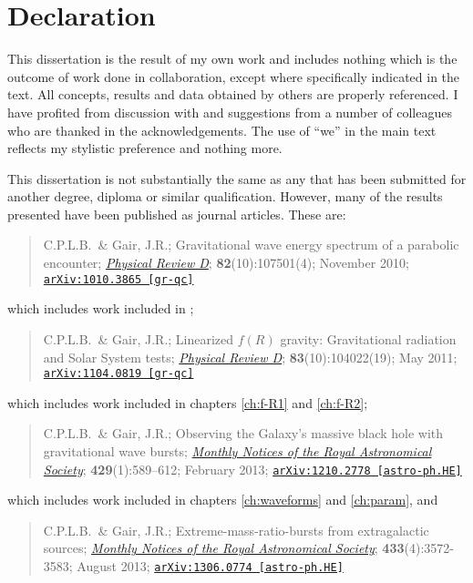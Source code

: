 \chapter*{Declaration}

This dissertation is the result of my own work and includes nothing which is the outcome of work done in collaboration, except where specifically indicated in the text. All concepts, results and data obtained by others are properly referenced. I have profited from discussion with and suggestions from a number of colleagues who are thanked in the acknowledgements. The use of ``we'' in the main text reflects my stylistic preference and nothing more.

This dissertation is not substantially the same as any that has been submitted for another degree, diploma or similar qualification. However, many of the results presented have been published as journal articles. These are:
\begin{quote}
C.P.L.B.\ \& Gair, J.R.; Gravitational wave energy spectrum of a parabolic encounter; \href{http://dx.doi.org/10.1103/PhysRevD.82.107501}{\it Physical Review D}; {\bf 82}(10):107501(4); November 2010; \linebreak \href{http://arxiv.org/abs/1010.3865}{\tt arXiv:1010.3865 [gr-qc]}
\end{quote}
which includes work included in ;
\begin{quote}
C.P.L.B.\ \& Gair, J.R.; Linearized $f(R)$ gravity: Gravitational radiation and Solar System tests; \href{http://dx.doi.org/10.1103/PhysRevD.83.104022}{\it Physical Review D}; {\bf 83}(10):104022(19); May 2011; \href{http://arxiv.org/abs/1104.0819}{\tt arXiv:1104.0819 [gr-qc]}
\end{quote}
which includes work included in chapters \ref{ch:f-R1} and \ref{ch:f-R2};
\begin{quote}
C.P.L.B.\ \& Gair, J.R.; Observing the Galaxy's massive black hole with gravitational wave bursts; \href{http://dx.doi.org/10.1093/mnras/sts360}{\it Monthly Notices of the Royal Astronomical Society}; {\bf 429}(1):589--612; February 2013; \href{http://arxiv.org/abs/1210.2778}{\tt arXiv:1210.2778 [astro-ph.HE]}
\end{quote}
which includes work included in chapters \ref{ch:waveforms} and \ref{ch:param}, and
\begin{quote}
C.P.L.B.\ \& Gair, J.R.; Extreme-mass-ratio-bursts from extragalactic sources; \href{http://dx.doi.org/10.1093/mnras/stt990}{\it Monthly Notices of the Royal Astronomical Society}; {\bf 433}(4):3572-3583; August 2013; \href{http://arxiv.org/abs/1210.2778}{\tt arXiv:1306.0774 [astro-ph.HE]}
\end{quote}
